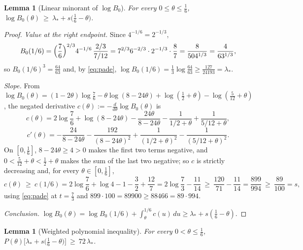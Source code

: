 \documentclass[11pt]{article}
\newtheorem{lemma}[theorem]{Lemma}
\theoremstyle{remark}
\theoremstyle{plain}
\theoremstyle{plain}
\begin{document}
\begin{lemma}[Linear minorant of $\log B_0$]\label{lem:B0linear}
For every $0\le\theta\le\frac16$,
$\log B_0(\theta)\ \ge\ \lambda_*+s\bigl(\frac16-\theta\bigr)$.
\end{lemma}

\begin{proof}
\emph{Value at the right endpoint.}  Since $4^{-1/6}=2^{-1/3}$,
\[
        B_0(1/6)
        =\Bigl(\frac76\Bigr)^{2/3}4^{-1/6}\,\frac{2/3}{7/12}
        =7^{2/3}6^{-2/3}\cdot2^{-1/3}\cdot\frac{8}{7}
        =\frac{8}{504^{1/3}}
        =\frac{4}{63^{1/3}},
\]
so $B_0(1/6)^3=\tfrac{64}{63}$ and, by \eqref{eq:pade}, $\log B_0(1/6)=\frac13\log\frac{64}{63}\ge\frac{127}{24193}=\lambda_*$.

\emph{Slope.}  From $\log B_0(\theta)=(1-2\theta)\log\frac76-\theta\log(8-24\theta)+\log(\frac12+\theta)-\log(\frac5{12}+\theta)$, the negated derivative $c(\theta):=-\frac{d}{d\theta}\log B_0(\theta)$ is
\[
        c(\theta)
        =2\log\frac76+\log(8-24\theta)-\frac{24\theta}{8-24\theta}
        -\frac{1}{1/2+\theta}+\frac{1}{5/12+\theta},
\]
\[
        c'(\theta)
        =-\frac{24}{8-24\theta}-\frac{192}{(8-24\theta)^2}
        +\frac{1}{(1/2+\theta)^2}-\frac{1}{(5/12+\theta)^2}.
\]
On $[0,\tfrac16]$, $8-24\theta\ge4>0$ makes the first two terms negative, and $0<\frac5{12}+\theta<\frac12+\theta$ makes the sum of the last two negative; so $c$ is strictly decreasing and, for every $\theta\in[0,\tfrac16]$,
\[
        c(\theta)\ \ge\ c(1/6)
        =2\log\frac76+\log4-1-\frac32+\frac{12}7
        =2\log\frac73-\frac{11}{14}
        \ \ge\ \frac{120}{71}-\frac{11}{14}
        =\frac{899}{994}
        \ \ge\ \frac{89}{100}=s,
\]
using \eqref{eq:pade} at $t=\tfrac73$ and $899\cdot100=89900\ge88466=89\cdot994$.

\emph{Conclusion.}  $\log B_0(\theta)=\log B_0(1/6)+\int_\theta^{1/6}c(u)\,du\ge\lambda_*+s(\frac16-\theta)$.
\end{proof}

\begin{lemma}[Weighted polynomial inequality]\label{lem:cubic}
For every $0<\theta\le\frac16$,
$P(\theta)\bigl[\lambda_*+s\bigl(\frac16-\theta\bigr)\bigr]\ \ge\ 72\,\lambda_*$.
\end{lemma}
\end{document}
